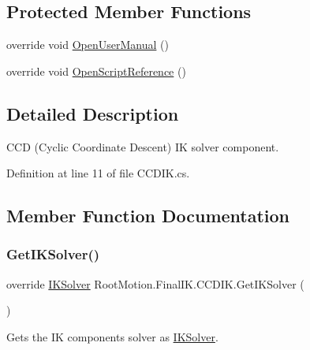 \subsection*{Protected Member Functions}
\begin{DoxyCompactItemize}
\item 
override void \mbox{\hyperlink{class_root_motion_1_1_final_i_k_1_1_c_c_d_i_k_a338aeec4a93d1b623f9a20a9e03b9677}{Open\+User\+Manual}} ()
\item 
override void \mbox{\hyperlink{class_root_motion_1_1_final_i_k_1_1_c_c_d_i_k_adf8dc52ac72a005efbc193fe59154b06}{Open\+Script\+Reference}} ()
\end{DoxyCompactItemize}


\subsection{Detailed Description}
C\+CD (Cyclic Coordinate Descent) IK solver component. 



Definition at line 11 of file C\+C\+D\+I\+K.\+cs.



\subsection{Member Function Documentation}
\mbox{\label{class_root_motion_1_1_final_i_k_1_1_c_c_d_i_k_a0bed91571fde99f94e6cec73ca6db310}} 
\subsubsection{\texorpdfstring{Get\+I\+K\+Solver()}{GetIKSolver()}}
{\footnotesize\ttfamily override \mbox{\hyperlink{class_root_motion_1_1_final_i_k_1_1_i_k_solver}{I\+K\+Solver}} Root\+Motion.\+Final\+I\+K.\+C\+C\+D\+I\+K.\+Get\+I\+K\+Solver (\begin{DoxyParamCaption}{ }\end{DoxyParamCaption})\hspace{0.3cm}{\ttfamily [virtual]}}



Gets the IK component\textquotesingle{}s solver as \mbox{\hyperlink{class_root_motion_1_1_final_i_k_1_1_i_k_solver}{I\+K\+Solver}}. 



